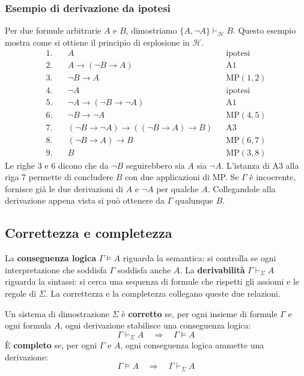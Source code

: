 \subsubsection*{Esempio di derivazione da ipotesi}
Per due formule arbitrarie $A$ e $B$, dimostriamo
$\{A,\neg A\}\vdash_{\mathcal{H}} B$. Questo esempio mostra come
si ottiene il principio di esplosione in $\mathcal{H}$.
\[
\begin{aligned}
    1.\quad & A
             && \text{ipotesi} \\
    2.\quad & A\to(\neg B\to A)
             && \text{A1} \\
    3.\quad & \neg B\to A
             && \mathrm{MP}(1,2) \\
    4.\quad & \neg A
             && \text{ipotesi} \\
    5.\quad & \neg A\to(\neg B\to\neg A)
             && \text{A1} \\
    6.\quad & \neg B\to\neg A
             && \mathrm{MP}(4,5) \\
    7.\quad & (\neg B\to\neg A)\to((\neg B\to A)\to B)
             && \text{A3} \\
    8.\quad & (\neg B\to A)\to B
             && \mathrm{MP}(6,7) \\
    9.\quad & B
             && \mathrm{MP}(3,8)
\end{aligned}
\]
Le righe 3 e 6 dicono che da $\neg B$ seguirebbero sia $A$ sia
$\neg A$. L'istanza di A3 alla riga 7 permette di concludere $B$
con due applicazioni di MP. Se $\Gamma$ è incoerente, fornisce già
le due derivazioni di $A$ e $\neg A$ per qualche $A$. Collegandole
alla derivazione appena vista si può ottenere da $\Gamma$ qualunque
$B$.


\subsection{Correttezza e completezza}
La \textbf{conseguenza logica} $\Gamma\models A$ riguarda la semantica:
si controlla se ogni interpretazione che soddisfa $\Gamma$ soddisfa
anche $A$. La \textbf{derivabilità} $\Gamma\vdash_\Sigma A$ riguarda
la sintassi: si cerca una sequenza di formule che rispetti gli assiomi
e le regole di $\Sigma$. La correttezza e la completezza collegano
queste due relazioni.

\noindent
\colorbox{SALZO}{\parbox{\dimexpr\linewidth-2\fboxsep}{
\begin{definition}
    Un sistema di dimostrazione $\Sigma$ è \textbf{corretto} se,
    per ogni insieme di formule $\Gamma$ e ogni formula $A$,
    ogni derivazione stabilisce una conseguenza logica:
    \[
        \Gamma\vdash_\Sigma A\quad\Longrightarrow\quad\Gamma\models A
    \]
    È \textbf{completo} se, per ogni $\Gamma$ e $A$, ogni
    conseguenza logica ammette una derivazione:
    \[
        \Gamma\models A\quad\Longrightarrow\quad\Gamma\vdash_\Sigma A
    \]
\end{definition}
}}%

